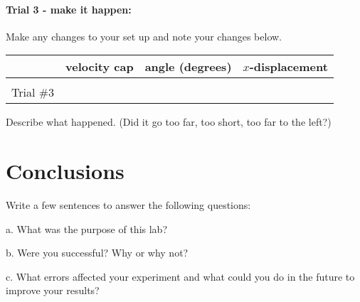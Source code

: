 \documentclass[10pt]{exam}
\begin{document}
\pagebreak
\paragraph{Trial 3 - make it happen:}  Make any changes to your set up and note your changes below.

\noindent
\begin{tabular}{|*4{l|}}
  \hline
  & velocity cap & angle (degrees) & $x$-displacement\\\hline
  &&& \\
  Trial \#3 &&& \\
  \hline
\end{tabular}

\noindent
Describe what happened. (Did it go too far, too short, too far to the left?)
\vspace{5em}


			
\section*{Conclusions}
Write a few sentences to answer the following questions:

a.	What was the purpose of this lab? 

b.	Were you successful?  Why or why not? 

c.	What errors affected your experiment and what could you do in the future to improve your results?
\end{document}
